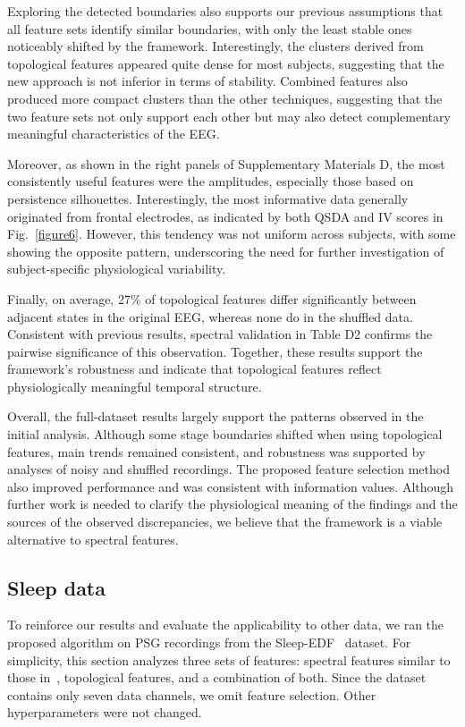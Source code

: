 \documentclass[pdflatex,sn-basic,Numbered]{sn-jnl}
\begin{document}
Exploring the detected boundaries also supports our previous assumptions that all feature sets identify similar boundaries, with only the least stable ones noticeably shifted by the framework. Interestingly, the clusters derived from topological features appeared quite dense for most subjects, suggesting that the new approach is not inferior in terms of stability. Combined features also produced more compact clusters than the other techniques, suggesting that the two feature sets not only support each other but may also detect complementary meaningful characteristics of the EEG.\@

Moreover, as shown in the right panels of Supplementary Materials D, the most consistently useful features were the amplitudes, especially those based on persistence silhouettes. Interestingly, the most informative data generally originated from frontal electrodes, as indicated by both QSDA and IV scores in Fig.~\ref{figure6}. However, this tendency was not uniform across subjects, with some showing the opposite pattern, underscoring the need for further investigation of subject-specific physiological variability.

Finally, on average, 27\% of topological features differ significantly between adjacent states in the original EEG, whereas none do in the shuffled data. Consistent with previous results, spectral validation in Table D2 confirms the pairwise significance of this observation. Together, these results support the framework's robustness and indicate that topological features reflect physiologically meaningful temporal structure.

Overall, the full-dataset results largely support the patterns observed in the initial analysis. Although some stage boundaries shifted when using topological features, main trends remained consistent, and robustness was supported by analyses of noisy and shuffled recordings. The proposed feature selection method also improved performance and was consistent with information values. Although further work is needed to clarify the physiological meaning of the findings and the sources of the observed discrepancies, we believe that the framework is a viable alternative to spectral features.

\subsection{Sleep data}

To reinforce our results and evaluate the applicability to other data, we ran the proposed algorithm on PSG recordings from the Sleep-EDF~\cite{SleepEdf,PhysioNet} dataset. For simplicity, this section analyzes three sets of features: spectral features similar to those in~\cite{SDA}, topological features, and a combination of both. Since the dataset contains only seven data channels, we omit feature selection. Other hyperparameters were not changed.
\end{document}
